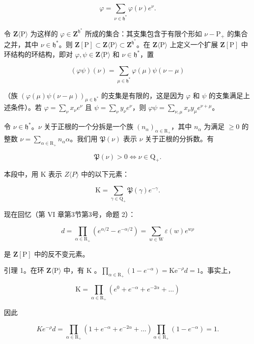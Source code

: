 \[
\varphi = \sum_ {\nu \in \mathfrak {h} ^ {*}} \varphi (\nu) e ^ {\nu}.
\]

令 \(\mathbf{Z}\langle\mathrm{P}\rangle\) 为这样的 \(\varphi\in\mathbf{Z}^{\mathfrak{h}^{*}}\) 所成的集合：其支集包含于有限个形如 \(\nu-\mathrm{P}_{+}\) 的集合之并，其中 \(\nu\in\mathfrak{h}^{*}\)。则 \(\mathbf{Z}[\mathrm{P}]\subset\mathbf{Z}\langle\mathrm{P}\rangle\subset\mathbf{Z}^{\mathfrak{h}^{*}}\)。在 \(\mathbf{Z}\langle\mathrm{P}\rangle\) 上定义一个扩展 \(\mathbf{Z}[\mathrm{P}]\) 中环结构的环结构，即对 \(\varphi,\psi\in\mathbf{Z}\langle\mathrm{P}\rangle\) 和 \(\nu\in\mathfrak{h}^{*}\)，置

\[
(\varphi \psi) (\nu) = \sum_ {\mu \in \mathfrak {h} ^ {*}} \varphi (\mu) \psi (\nu - \mu)
\]

（族 \((\varphi(\mu)\psi(\nu - \mu))_{\mu \in \mathfrak{h}^*}\) 的支集是有限的，这是因为 \(\varphi\) 和 \(\psi\) 的支集满足上述条件）。若 \(\varphi = \sum_{\nu} x_{\nu} e^{\nu}\) 且 \(\psi = \sum_{\nu} y_{\nu} e^{\nu}\)，则 \(\varphi \psi = \sum_{\nu, \mu} x_{\nu} y_{\mu} e^{\nu + \mu}\)。

令 \(\nu \in \mathfrak{h}^*\)。\(\nu\) 关于正根的一个分拆是一个族 \((n_{\alpha})_{\alpha \in \mathrm{R}_{+}}\)，其中 \(n_{\alpha}\) 为满足 \(\geq 0\) 的整数 \(\nu = \sum_{\alpha \in \mathrm{R}_{+}} n_{\alpha} \alpha\)。我们用 \(\mathfrak{P}(\nu)\) 表示 \(\nu\) 关于正根的分拆数。有

\[
\mathfrak {P} (\nu) > 0 \Longleftrightarrow \nu \in \mathrm{Q} _ {+}.
\]

本段中，用 K 表示 \(Z\langle P\rangle\) 中的以下元素：

\[
\mathrm{K} = \sum_ {\gamma \in \mathrm{Q} _ {+}} \mathfrak {P} (\gamma) e ^ {- \gamma}.
\]

现在回忆（第 VI 章第3节第3号，命题 2）：

\[
d = \prod_ {\alpha \in \mathrm{R} _ {+}} (e ^ {\alpha / 2} - e ^ {- \alpha / 2}) = \sum_ {w \in \mathrm{W}} \varepsilon (w) e ^ {w \rho}
\]

是 \(\mathbf{Z}[\mathrm{P}]\) 中的反不变元素。

引理 1。在环 \(\mathbf{Z}\langle \mathrm{P}\rangle\) 中，有 \(\mathrm{K}\) 。\(\prod_{\alpha \in \mathrm{R}_{+}}(1 - e^{-\alpha}) = \mathrm{Ke}^{-\rho}d = 1\)。事实上，

\[
\mathrm{K} = \prod_ {\alpha \in \mathrm{R} _ {+}} \left(e ^ {0} + e ^ {- \alpha} + e ^ {- 2 \alpha} + \dots\right)
\]

因此

\[
K e ^ {- \rho} d = \prod_ {\alpha \in \mathrm{R} _ {+}} \left(1 + e ^ {- \alpha} + e ^ {- 2 \alpha} + \dots\right) \prod_ {\alpha \in \mathrm{R} _ {+}} \left(1 - e ^ {- \alpha}\right) = 1.
\]

